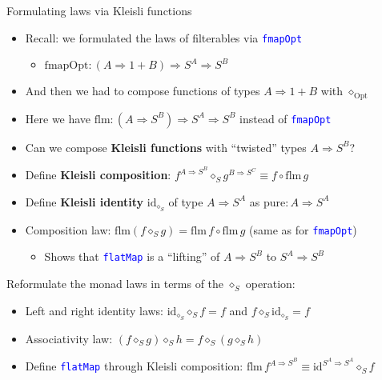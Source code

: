 \documentclass[english]{beamer}
\begin{document}
\begin{frame}{Formulating laws via Kleisli functions}
\begin{itemize}
\item Recall: we formulated the laws of filterables via \texttt{\textcolor{blue}{\footnotesize{}fmapOpt}} 
\begin{itemize}
\item $\text{fmapOpt}:\left(A\Rightarrow1+B\right)\Rightarrow S^{A}\Rightarrow S^{B}$
\end{itemize}
\item And then we had to compose functions of types $A\Rightarrow1+B$ with
$\diamond_{\text{Opt}}$
\item Here we have $\text{flm}:\left(A\Rightarrow S^{B}\right)\Rightarrow S^{A}\Rightarrow S^{B}$
instead of \texttt{\textcolor{blue}{\footnotesize{}fmapOpt}} 
\item Can we compose \textbf{Kleisli functions} with ``twisted'' types
$A\Rightarrow S^{B}$?
\item Define \textbf{Kleisli composition}: $f^{A\Rightarrow S^{B}}\diamond_{S}g^{B\Rightarrow S^{C}}\equiv f\circ\text{flm}\,g$
\item Define \textbf{Kleisli identity} $\text{id}_{\diamond_{S}}$ of type
$A\Rightarrow S^{A}$ as $\text{pure}:A\Rightarrow S^{A}$
\item Composition law: $\text{flm}\left(f\diamond_{S}g\right)=\text{flm}\,f\circ\text{flm}\,g$
(same as for \texttt{\textcolor{blue}{\footnotesize{}fmapOpt}})
\begin{itemize}
\item Shows that \texttt{\textcolor{blue}{\footnotesize{}flatMap}} is a
``lifting'' of $A\Rightarrow S^{B}$ to $S^{A}\Rightarrow S^{B}$
\end{itemize}
\end{itemize}
Reformulate the monad laws in terms of the $\diamond_{S}$ operation:
\begin{itemize}
\item Left and right identity laws: $\text{id}_{\diamond_{S}}\diamond_{S}f=f$
and $f\diamond_{S}\text{id}_{\diamond_{S}}=f$
\item Associativity law: $\left(f\diamond_{S}g\right)\diamond_{S}h=f\diamond_{S}\left(g\diamond_{S}h\right)$
\item Define \texttt{\textcolor{blue}{\footnotesize{}flatMap}} through Kleisli
composition: $\text{flm}\,f^{A\Rightarrow S^{B}}\equiv\text{id}^{S^{A}\Rightarrow S^{A}}\diamond_{S}f$
\end{itemize}
\end{frame}
\end{document}
